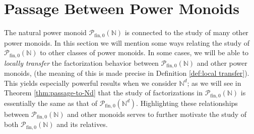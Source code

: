 \documentclass{report}
\newcommand{\NN}{\mathbb{N}}
\renewcommand{\P}{\mathcal{P}}
\newcommand{\ZZ}{\mathbb{Z}}
\newcommand{\fin}{\textrm{fin}}
\newcommand{\funt}{{\textrm{fin}, \times}}
\newcommand{\fun}{{\textrm{fin}, 1}}
\newcommand{\fon}{{\textrm{fin}, 0}}
\renewcommand{\:}{\text{:}}
\newcommand{\PN}{{\P_{\fin,0}(\NN)}}
\theoremstyle{definition}
\newtheorem{prop}[defn]{Proposition}
\begin{document}
\section{Passage Between Power Monoids}\label{sec:passage}


The natural power monoid $\PN$ is connected to the study of many other power monoids.
In this section we will mention some ways relating the study of $\PN$ to other classes of power monoids.
In some cases, we will be able to \textit{locally transfer} the factorization behavior between $\PN$ and other power monoids, (the meaning of this is made precise in Definition \ref{def:local transfer}).
This yields especially powerful results when we consider $\NN^d$; as we will see in Theorem \ref{thm:passage-to-Nd} that the study of factorizations in $\PN$ is essentially the same as that of $\P_\fon(\NN^d)$.
Highlighting these relationships between $\PN$ and other monoids serves to further motivate the study of both $\PN$ and its relatives.






\end{document}
